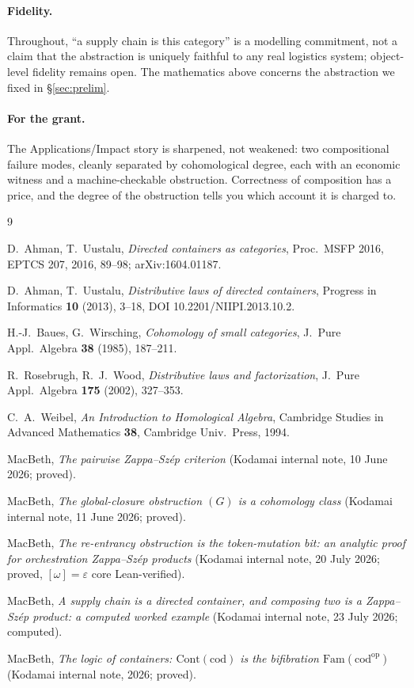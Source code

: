 \documentclass[11pt]{article}
\theoremstyle{definition}
\newcommand{\cod}{\mathrm{cod}}
\begin{document}
\paragraph{Fidelity.} Throughout, ``a supply chain is this category'' is a modelling
commitment, not a claim that the abstraction is uniquely faithful to any real logistics system;
object-level fidelity remains open. The mathematics above concerns the abstraction we fixed in
\S\ref{sec:prelim}.

\paragraph{For the grant.} The Applications/Impact story is sharpened, not weakened: two
compositional failure modes, cleanly separated by cohomological degree, each with an economic
witness and a machine-checkable obstruction. Correctness of composition has a price, and the
degree of the obstruction tells you which account it is charged to.

\begin{thebibliography}{9}

D.~Ahman, T.~Uustalu,
\emph{Directed containers as categories},
Proc.\ MSFP 2016, EPTCS 207, 2016, 89--98; arXiv:1604.01187.

D.~Ahman, T.~Uustalu,
\emph{Distributive laws of directed containers},
Progress in Informatics \textbf{10} (2013), 3--18, DOI 10.2201/NIIPI.2013.10.2.

H.-J.~Baues, G.~Wirsching,
\emph{Cohomology of small categories},
J.\ Pure Appl.\ Algebra \textbf{38} (1985), 187--211.

R.~Rosebrugh, R.~J.~Wood,
\emph{Distributive laws and factorization},
J.\ Pure Appl.\ Algebra \textbf{175} (2002), 327--353.

C.~A.~Weibel,
\emph{An Introduction to Homological Algebra},
Cambridge Studies in Advanced Mathematics \textbf{38}, Cambridge Univ.\ Press, 1994.

MacBeth,
\emph{The pairwise Zappa--Sz\'ep criterion}
(Kodamai internal note, 10 June 2026; proved).

MacBeth,
\emph{The global-closure obstruction $(G)$ is a cohomology class}
(Kodamai internal note, 11 June 2026; proved).

MacBeth,
\emph{The re-entrancy obstruction is the token-mutation bit: an analytic proof for orchestration
Zappa--Sz\'ep products}
(Kodamai internal note, 20 July 2026; proved, $[\omega]=\varepsilon$ core Lean-verified).

MacBeth,
\emph{A supply chain is a directed container, and composing two is a Zappa--Sz\'ep product: a
computed worked example}
(Kodamai internal note, 23 July 2026; computed).

MacBeth,
\emph{The logic of containers: $\mathrm{Cont}(\cod)$ is the bifibration
$\mathrm{Fam}(\cod^{\mathrm{op}})$}
(Kodamai internal note, 2026; proved).

\end{thebibliography}
\end{document}
